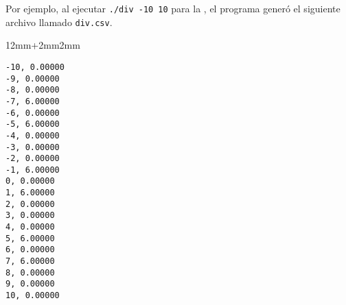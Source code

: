 Por ejemplo, al ejecutar \texttt{./div -10 10} para la , el programa generó el siguiente archivo llamado \texttt{div.csv}.
\bigskip

{
\footnotesize
\renewcommand\ttdefault{cmtt}
\begin{adjustwidth}{12mm+2mm}{2mm}
\begin{lstlisting}[numbers=none]
-10, 0.00000
-9, 0.00000
-8, 0.00000
-7, 6.00000
-6, 0.00000
-5, 6.00000
-4, 0.00000
-3, 0.00000
-2, 0.00000
-1, 6.00000
0, 0.00000
1, 6.00000
2, 0.00000
3, 0.00000
4, 0.00000
5, 6.00000
6, 0.00000
7, 6.00000
8, 0.00000
9, 0.00000
10, 0.00000
\end{lstlisting}
\end{adjustwidth}
}
